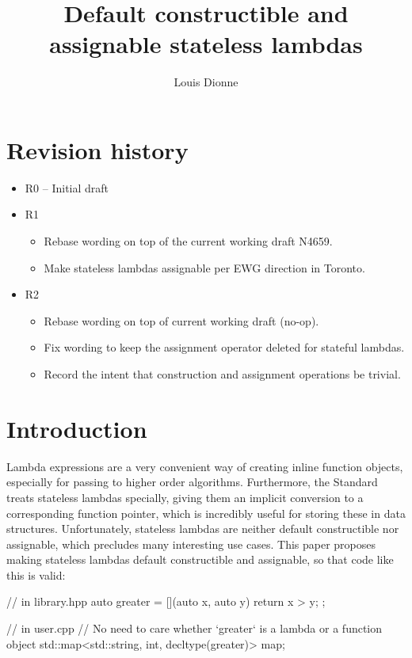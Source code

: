 \documentclass{wg21}
\title{Default constructible and assignable stateless lambdas}
\author{Louis Dionne}{ldionne.2@gmail.com}
\begin{document}
\maketitle

\section{Revision history}
\begin{itemize}
  \item R0 -- Initial draft
  \item R1 \begin{itemize}
             \item Rebase wording on top of the current working draft N4659.
             \item Make stateless lambdas assignable per EWG direction in Toronto.
           \end{itemize}
  \item R2 \begin{itemize}
             \item Rebase wording on top of current working draft \cite{N4700} (no-op).
             \item Fix wording to keep the assignment operator deleted for stateful lambdas.
             \item Record the intent that construction and assignment operations be trivial.
           \end{itemize}
\end{itemize}


\section{Introduction}
Lambda expressions are a very convenient way of creating inline function objects,
especially for passing to higher order algorithms. Furthermore, the Standard
treats stateless lambdas specially, giving them an implicit conversion to a
corresponding function pointer, which is incredibly useful for storing these
in data structures. Unfortunately, stateless lambdas are neither default
constructible nor assignable, which precludes many interesting use cases.
This paper proposes making stateless lambdas default constructible and
assignable, so that code like this is valid:

\begin{cpp}
// in library.hpp
auto greater = [](auto x, auto y) { return x > y; };

// in user.cpp
// No need to care whether `greater` is a lambda or a function object
std::map<std::string, int, decltype(greater)> map;
\end{cpp}
\end{document}
